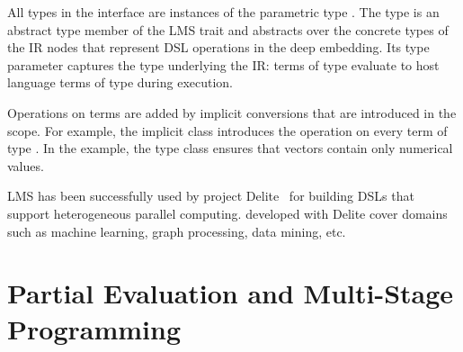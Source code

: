 All types in the  interface are instances of the
parametric type .  The  type is an abstract
type member of the  LMS trait and abstracts over the
concrete types of the IR nodes that represent DSL operations in the
deep embedding.  Its type parameter captures the type underlying the
IR: \edsl terms of type  evaluate to host language terms
of type  during \edsl execution.

Operations on  terms are added by implicit conversions that are introduced in the \edsl scope. For example, the implicit class  introduces the \code{+} operation on every term of type . In the example, the type class  ensures that vectors contain only numerical values.

LMS has been successfully used by project Delite~\cite{brown_heterogeneous_2011,composition-ecoop2013} for building DSLs that support heterogeneous parallel computing. \edsls developed with Delite cover domains
such as machine learning, graph processing, data mining, etc.


\section{Partial Evaluation and Multi-Stage Programming}
\label{sec:partial-evaluation}
